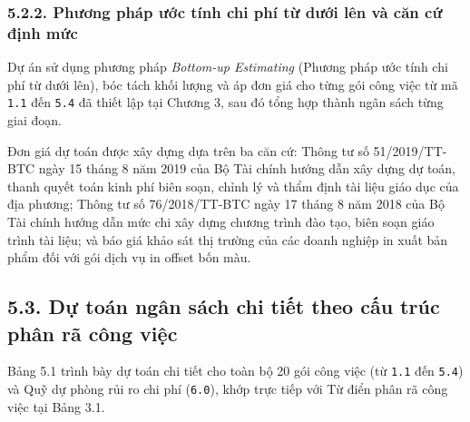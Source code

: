 \subsubsection{5.2.2. Phương pháp ước tính chi phí từ dưới lên và căn cứ định mức}

Dự án sử dụng phương pháp \textit{Bottom-up Estimating} (Phương pháp ước tính chi phí từ dưới lên), bóc tách khối lượng và áp đơn giá cho từng gói công việc từ mã \texttt{1.1} đến \texttt{5.4} đã thiết lập tại Chương 3, sau đó tổng hợp thành ngân sách từng giai đoạn.

Đơn giá dự toán được xây dựng dựa trên ba căn cứ: Thông tư số 51/2019/TT-BTC ngày 15 tháng 8 năm 2019 của Bộ Tài chính hướng dẫn xây dựng dự toán, thanh quyết toán kinh phí biên soạn, chỉnh lý và thẩm định tài liệu giáo dục của địa phương; Thông tư số 76/2018/TT-BTC ngày 17 tháng 8 năm 2018 của Bộ Tài chính hướng dẫn mức chi xây dựng chương trình đào tạo, biên soạn giáo trình tài liệu; và báo giá khảo sát thị trường của các doanh nghiệp in xuất bản phẩm đối với gói dịch vụ in offset bốn màu.

\subsection{5.3. Dự toán ngân sách chi tiết theo cấu trúc phân rã công việc}

Bảng 5.1 trình bày dự toán chi tiết cho toàn bộ 20 gói công việc (từ \texttt{1.1} đến \texttt{5.4}) và Quỹ dự phòng rủi ro chi phí (\texttt{6.0}), khớp trực tiếp với Từ điển phân rã công việc tại Bảng 3.1.

